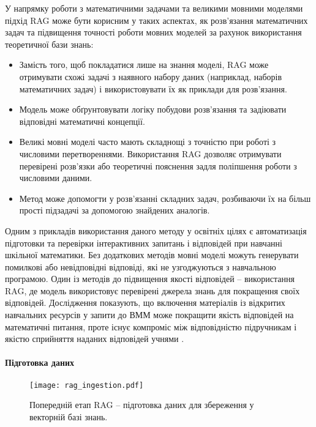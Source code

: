 У напрямку роботи з математичними задачами та великими мовними моделями підхід RAG може бути корисним у таких аспектах, як розв'язання математичних задач та підвищення точності роботи мовних моделей за рахунок використання теоретичної бази знань:
\begin{itemize}
    \item Замість того, щоб покладатися лише на знання моделі, RAG може отримувати схожі задачі з наявного набору даних (наприклад, наборів математичних задач) і використовувати їх як приклади для розв’язання.
    \item Модель може обґрунтовувати логіку побудови розв'язання та задіювати відповідні математичні концепції.
    \item Великі мовні моделі часто мають складнощі з точністю при роботі з числовими перетвореннями. Використання RAG дозволяє отримувати перевірені розв’язки або теоретичні пояснення задля поліпшення роботи з числовими даними.
    \item Метод може допомогти у розв’язанні складних задач, розбиваючи їх на більш прості підзадачі за допомогою знайдених аналогів.
\end{itemize}

Одним з прикладів використання даного методу у освітніх цілях є автоматизація підготовки та перевірки інтерактивних запитань і відповідей при навчанні шкільної математики. Без додаткових методів мовні моделі можуть генерувати помилкові або невідповідні відповіді, які не узгоджуються з навчальною програмою. Один із методів до підвищення якості відповідей -- використання RAG, де модель використовує перевірені джерела знань для покращення своїх відповідей. Дослідження показують, що включення матеріалів із відкритих навчальних ресурсів у запити до ВММ може покращити якість відповідей на математичні питання, проте існує компроміс між відповідністю підручникам і якістю сприйняття наданих відповідей учнями \cite{levonian2023retrievalaugmentedgenerationimprovemath}.

\paragraph{Підготовка даних}

\begin{figure}[h]
    \centering
    \texttt{[image: rag\_ingestion.pdf]}
    \caption{Попередній етап RAG -- підготовка даних для збереження у векторній базі знань.}
    \label{fig:rag_ingestion}
\end{figure}

